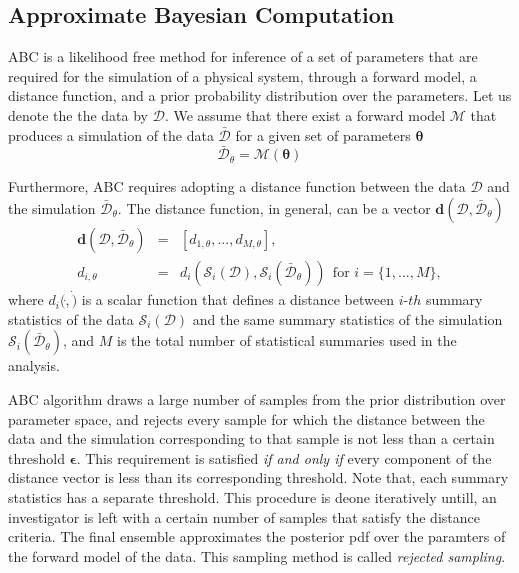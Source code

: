 \documentclass[12pt, preprint]{aastex}
\newcommand{\beq}{\begin{equation}}
\newcommand{\eeq}{\end{equation}}
\begin{document}
\subsection{Approximate Bayesian Computation}

ABC is a likelihood free method for inference of a set of parameters that are required for the simulation of a 
physical system, through a forward model, a distance function, and a prior probability distribution over the parameters. 
Let us denote the the data by $\mathcal{D}$. We assume that there exist a forward model $\mathcal{M}$ that 
produces a simulation of the data $\bar{\mathcal{D}}$ for a given set of parameters $\bm{\theta}$
\beq
\bar{\mathcal{D}}_{\theta} = \mathcal{M}(\bm{\theta})
\eeq

Furthermore, ABC requires adopting a distance function between the data $\mathcal{D}$ and the simulation $\bar{\mathcal{D}}_{\theta}$.
The distance function, in general, can be a vector $\bm{d}(\mathcal{D},\bar{\mathcal{D}}_{\theta})$
\begin{eqnarray}
\bm{d}(\mathcal{D},\bar{\mathcal{D}}_{\theta}) &=& [d_{1,\theta}, ... , d_{M,\theta}], \\
d_{i,\theta} &=& d_{i}(\mathcal{S}_{i}(\mathcal{D}), \mathcal{S}_{i}(\bar{\mathcal{D}}_{\theta}))  ~~\mbox{for $i=\{1,...,M\}$},
\end{eqnarray}
where $d_{i}(\dot,\dot)$ is a scalar function that defines a distance 
between $i$-$th$ summary statistics of the data $\mathcal{S}_{i}(\mathcal{D})$ and the same summary statistics of 
the simulation $\mathcal{S}_{i}(\bar{\mathcal{D}}_{\theta})$, and $M$ is the total number of statistical summaries 
used in the analysis.

ABC algorithm draws a large number of samples from the prior distribution over parameter space, 
and rejects every sample for which the distance between the data and the simulation corresponding to that 
sample is not less than a certain threshold $\bm{\epsilon}$. This requirement is satisfied \emph{if and only if}
every component of the distance vector is less than its corresponding threshold. Note that, each summary statistics 
has a separate threshold. This procedure is deone iteratively untill, an investigator is left with a certain number 
of samples that satisfy the distance criteria. The final ensemble approximates the posterior pdf over 
the paramters of the forward model of the data. This sampling method is called \emph{rejected sampling}.
\end{document}
